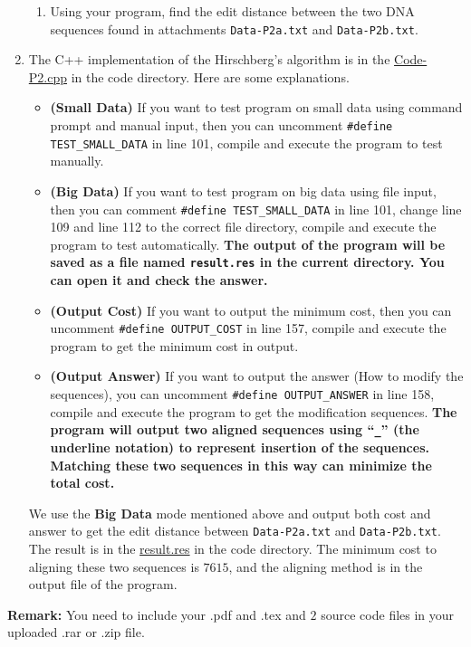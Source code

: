 \documentclass[12pt,a4paper]{article}
\makeatletter
\newtheorem*{solution}{Solution}
\theoremstyle{definition}
\renewenvironment{solution}[1][Solution] {\par\pushQED{\qed}\normalfont\topsep6\p@\@plus6\p@\relax\trivlist\item[\hskip\labelsep\bfseries#1\@addpunct{.}]\ignorespaces}{\popQED\endtrivlist\@endpefalse} \makeatother
\makeatother
\begin{document}
\begin{enumerate}
\begin{enumerate}
        \item
        Using your program, find the edit distance between the two DNA sequences found in attachments \texttt{Data-P2a.txt} and \texttt{Data-P2b.txt}.
    \end{enumerate}
    \begin{solution}
        The C++ implementation of the Hirschberg's algorithm is in the \href{code/Code-P2.cpp}{Code-P2.cpp} in the code directory. Here are some explanations.
        \begin{itemize}
        \item \textbf{(Small Data)} If you want to test program on small data using command prompt and manual input, then you can uncomment \texttt{\#define TEST\_SMALL\_DATA} in line 101, compile and execute the program to test manually.
        \item \textbf{(Big Data)} If you want to test program on big data using file input, then you can comment \texttt{\#define TEST\_SMALL\_DATA} in line 101, change line 109 and line 112 to the correct file directory, compile and execute the program to test automatically. \textbf{\color{purple} The output of the program will be saved as a file named \texttt{result.res} in the current directory. You can open it and check the answer.}
        \item \textbf{(Output Cost)} If you want to output the minimum cost, then you can uncomment \texttt{\#define OUTPUT\_COST} in line 157, compile and execute the program to get the minimum cost in output.
        \item \textbf{(Output Answer)} If you want to output the answer (How to modify the sequences), you can uncomment \texttt{\#define OUTPUT\_ANSWER} in line 158, compile and execute the program to get the modification sequences. \textbf{\color{purple} The program will output two aligned sequences using ``\texttt{\_}'' (the underline notation) to represent insertion of the sequences. Matching these two sequences in this way can minimize the total cost.}
        \end{itemize}

        We use the \textbf{Big Data} mode mentioned above and output both cost and answer to get the edit distance between \texttt{Data-P2a.txt} and \texttt{Data-P2b.txt}. The result is in the \href{code/result.res}{result.res} in the code directory. The minimum cost to aligning these two sequences is $7615$, and the aligning method is in the output file of the program.
    \end{solution}

\end{enumerate}

\vspace{20pt}

\textbf{Remark:} You need to include your .pdf and .tex and {\color{red}\emph{$2$}} source code files in your uploaded .rar or .zip file.

\end{document}
